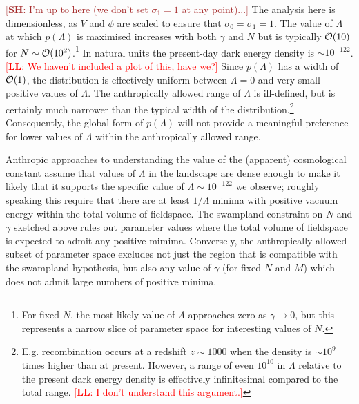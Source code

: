 \documentclass[12pt]{article}
\newcommand{\lfl}[1]{\textcolor{red}{[{\bf LL}: #1]}}
\newcommand{\SH}[1]{\textcolor{brown}{[{\bf SH}: #1]}}
\begin{document}
\SH{I'm up to here (we don't set $\sigma_1=1$ at any point)...} The analysis  here is dimensionless, as $V$ and $\phi$ are scaled to ensure that $\sigma_0 = \sigma_1 = 1$. The value of $\Lambda$ at which $p(\Lambda)$ is maximised increases with both $\gamma$ and $N$ but  is typically  ${\cal{O}}(10)$ for $N\sim{\cal{O}}(10^2)$.\footnote{For fixed $N$, the most likely value of $\Lambda$ approaches zero as $\gamma \rightarrow 0$, but this represents a narrow slice of parameter space for interesting values of $N$.} In natural units the present-day dark energy density is $\sim 10^{-122}$. \lfl{We haven't included a plot of this, have we?} Since $p(\Lambda)$  has a width of  ${\cal{O}}(1)$, the distribution is effectively uniform between $\Lambda=0$ and very small positive values of $\Lambda$. The anthropically allowed range of $\Lambda$ is ill-defined, but is certainly much narrower than the typical width of the distribution.\footnote{E.g. recombination occurs at a redshift $z\sim 1000$ when the density is $\sim 10^9$ times higher than at present. However, a range of even $10^{10}$ in $\Lambda$ relative to the present dark energy density is effectively infinitesimal compared to the total range. \lfl{I don't understand this argument.}} Consequently, the global form of $p(\Lambda)$ will  not provide a meaningful preference for lower values of $\Lambda$ within the anthropically allowed range. 

Anthropic approaches to understanding the value of the (apparent) cosmological constant assume that values of $\Lambda$ in the landscape are  dense enough to make it likely that it supports the specific value of $\Lambda \sim 10^{-122}$ we observe; roughly speaking this require that there are at least $1/\Lambda$ minima with positive vacuum energy within the total volume of fieldspace. The swampland constraint on $N$ and $\gamma$ sketched above rules out parameter values where the total volume of fieldspace is expected to admit any positive mimima. Conversely, the anthropically allowed subset of parameter space excludes not just the region that is compatible with the swampland hypothesis, but also any value of $\gamma$ (for fixed $N$ and $M$) which does not admit large numbers of positive minima.
\end{document}
